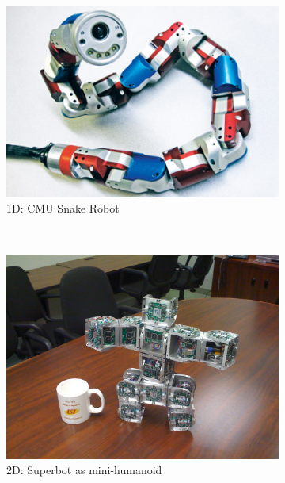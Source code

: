 \begin{figure}[h]
		\centering
        \begin{subfigure}[b]{0.3\textwidth}
                \centering
                \includegraphics[width=\textwidth]{images/Conf_1D_CMU_snake_robot.jpg}
                \caption{1D: CMU Snake Robot}
                \label{fig:config_1D}
        \end{subfigure}
        ~
        \begin{subfigure}[b]{0.3\textwidth}
                \centering
                \includegraphics[width=\textwidth]{images/Conf_2D_superbot.jpg}
                \caption{2D: Superbot as mini-humanoid}
                \label{fig:config_2D}
        \end{subfigure}
        ~
        \begin{subfigure}[b]{0.3\textwidth}

\end{subfigure}
\end{figure}
